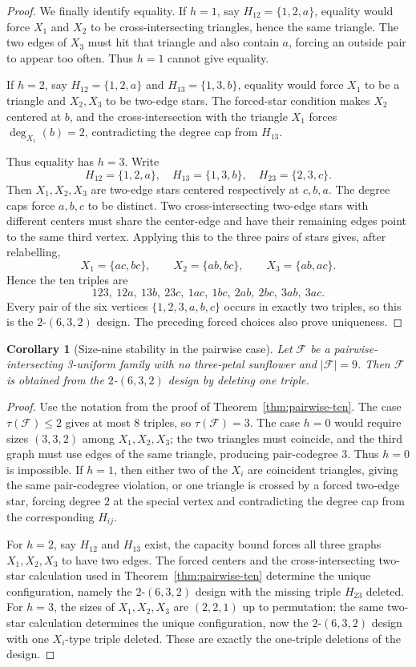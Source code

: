 \documentclass[11pt]{article}
\newtheorem{corollary}[theorem]{Corollary}
\newcommand{\F}{\mathcal F}
\begin{document}
\begin{proof}
We finally identify equality.  If $h=1$, say $H_{12}=\{1,2,a\}$, equality
would force $X_1$ and $X_2$ to be cross-intersecting triangles, hence the
same triangle.  The two edges of $X_3$ must hit that triangle and also contain
$a$, forcing an outside pair to appear too often.  Thus $h=1$ cannot give
equality.

If $h=2$, say $H_{12}=\{1,2,a\}$ and $H_{13}=\{1,3,b\}$, equality would force
$X_1$ to be a triangle and $X_2,X_3$ to be two-edge stars.  The forced-star
condition makes $X_2$ centered at $b$, and the cross-intersection with the
triangle $X_1$ forces $\deg_{X_1}(b)=2$, contradicting the degree cap from
$H_{13}$.

Thus equality has $h=3$.  Write
\[
  H_{12}=\{1,2,a\},\quad
  H_{13}=\{1,3,b\},\quad
  H_{23}=\{2,3,c\}.
\]
Then $X_1,X_2,X_3$ are two-edge stars centered respectively at $c,b,a$.
The degree caps force $a,b,c$ to be distinct.  Two cross-intersecting
two-edge stars with different centers must share the center-edge and have
their remaining edges point to the same third vertex.  Applying this to the
three pairs of stars gives, after relabelling,
\[
  X_1=\{ac,bc\},\qquad
  X_2=\{ab,bc\},\qquad
  X_3=\{ab,ac\}.
\]
Hence the ten triples are
\[
  123,\ 12a,\ 13b,\ 23c,\ 1ac,\ 1bc,\ 2ab,\ 2bc,\ 3ab,\ 3ac.
\]
Every pair of the six vertices $\{1,2,3,a,b,c\}$ occurs in exactly two
triples, so this is the $2$-$(6,3,2)$ design.  The preceding forced choices
also prove uniqueness.
\end{proof}

\begin{corollary}[Size-nine stability in the pairwise case]
\label{cor:size-nine}
Let $\F$ be a pairwise-intersecting 3-uniform family with no three-petal
sunflower and $|\F|=9$.  Then $\F$ is obtained from the $2$-$(6,3,2)$ design
by deleting one triple.
\end{corollary}

\begin{proof}
Use the notation from the proof of Theorem~\ref{thm:pairwise-ten}.  The case
$\tau(\F)\le 2$ gives at most $8$ triples, so $\tau(\F)=3$.  The case $h=0$
would require sizes $(3,3,2)$ among $X_1,X_2,X_3$; the two triangles must
coincide, and the third graph must use edges of the same triangle, producing
pair-codegree $3$.  Thus $h=0$ is impossible.  If $h=1$, then either two of
the $X_i$ are coincident triangles, giving the same pair-codegree violation,
or one triangle is crossed by a forced two-edge star, forcing degree $2$ at
the special vertex and contradicting the degree cap from the corresponding
$H_{ij}$.

For $h=2$, say $H_{12}$ and $H_{13}$ exist, the capacity bound forces all
three graphs $X_1,X_2,X_3$ to have two edges.  The forced centers and the
cross-intersecting two-star calculation used in
Theorem~\ref{thm:pairwise-ten} determine the unique configuration, namely
the $2$-$(6,3,2)$ design with the missing triple $H_{23}$ deleted.  For
$h=3$, the sizes of $X_1,X_2,X_3$ are $(2,2,1)$ up to permutation; the same
two-star calculation determines the unique configuration, now the
$2$-$(6,3,2)$ design with one $X_i$-type triple deleted.  These are exactly
the one-triple deletions of the design.
\end{proof}
\end{document}
